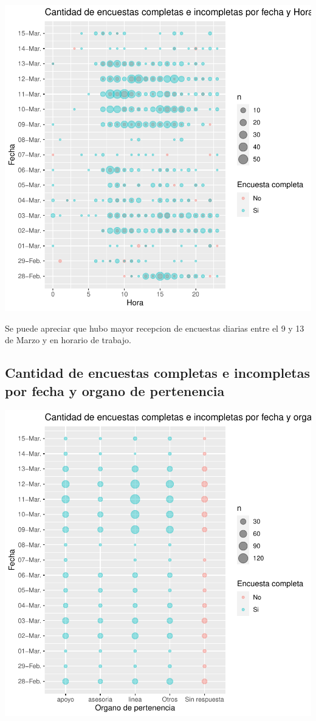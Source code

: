 \documentclass{article}
\begin{document}
\includegraphics{seguimientov3-034}

Se puede apreciar que hubo mayor recepcion de encuestas diarias entre el 9 y 13 de Marzo y en horario de trabajo.

\subsection{Cantidad de encuestas completas e incompletas por fecha y organo de pertenencia}

\includegraphics{seguimientov3-035}
\end{document}
